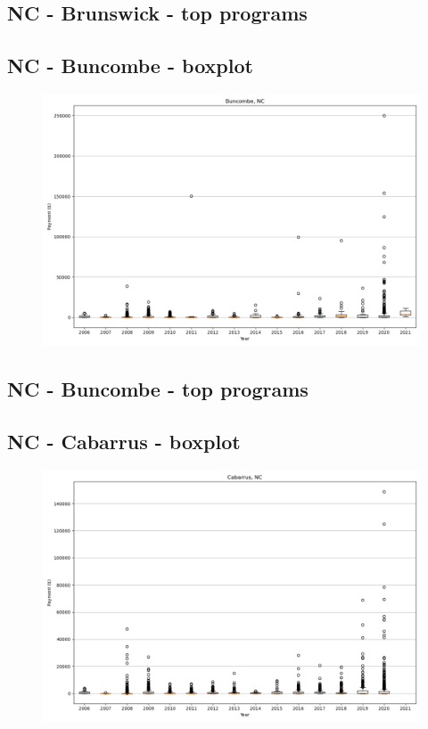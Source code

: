 \subsection*{NC - Brunswick - top programs}

\newpage
\subsection*{NC - Buncombe - boxplot}
\begin{figure}[h]
\centering
\includegraphics[width=7in]{../output/boxplots/counties/Buncombe-NC_boxplot.png}
\end{figure}


\subsection*{NC - Buncombe - top programs}

\newpage
\subsection*{NC - Cabarrus - boxplot}
\begin{figure}[h]
\centering
\includegraphics[width=7in]{../output/boxplots/counties/Cabarrus-NC_boxplot.png}
\end{figure}


